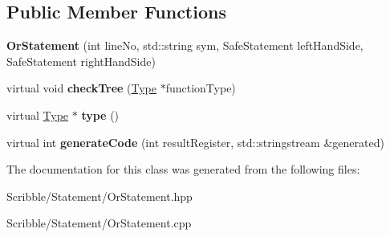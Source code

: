 \subsection*{Public Member Functions}
\begin{DoxyCompactItemize}
\item 
\hypertarget{class_or_statement_a037202929b4b7022ab077617d129ee8f}{{\bfseries Or\-Statement} (int line\-No, std\-::string sym, Safe\-Statement left\-Hand\-Side, Safe\-Statement right\-Hand\-Side)}\label{class_or_statement_a037202929b4b7022ab077617d129ee8f}

\item 
\hypertarget{class_or_statement_a7ffea57038a40fcdfc9a96e3ba366a7c}{virtual void {\bfseries check\-Tree} (\hyperlink{class_type}{Type} $\ast$function\-Type)}\label{class_or_statement_a7ffea57038a40fcdfc9a96e3ba366a7c}

\item 
\hypertarget{class_or_statement_a6bceec35cd518b8dea154dff5b6e32c9}{virtual \hyperlink{class_type}{Type} $\ast$ {\bfseries type} ()}\label{class_or_statement_a6bceec35cd518b8dea154dff5b6e32c9}

\item 
\hypertarget{class_or_statement_af564247b02179339f8f32a7030304731}{virtual int {\bfseries generate\-Code} (int result\-Register, std\-::stringstream \&generated)}\label{class_or_statement_af564247b02179339f8f32a7030304731}

\end{DoxyCompactItemize}


The documentation for this class was generated from the following files\-:\begin{DoxyCompactItemize}
\item 
Scribble/\-Statement/Or\-Statement.\-hpp\item 
Scribble/\-Statement/Or\-Statement.\-cpp\end{DoxyCompactItemize}
